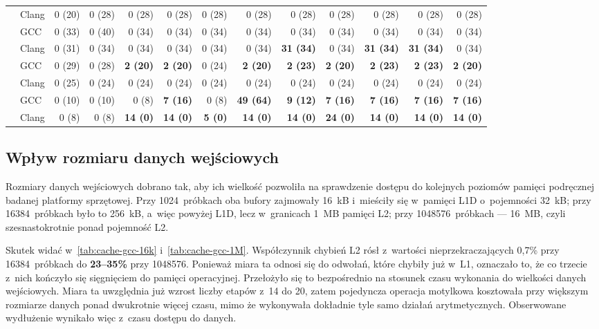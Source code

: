 \begin{table}[H]
\begin{tabular}{llrrrrrrrrrrr}
  & Clang & 0 (20) & 0 (28) & 0 (28) & 0 (28) & 0 (28) & 0 (28) & 0 (28) & 0 (28) & 0 (28) & 0 (28) & 0 (28) \\
\addlinespace
\multirow{2}{*}{radix4\_naive}
  & GCC   & 0 (33) & 0 (40) & 0 (34) & 0 (34) & 0 (34) & 0 (34) & 0 (34) & 0 (34) & 0 (34) & 0 (34) & 0 (34) \\
  & Clang & 0 (31) & 0 (34) & 0 (34) & 0 (34) & 0 (34) & 0 (34) & \textbf{31 (34)} & 0 (34) & \textbf{31 (34)} & \textbf{31 (34)} & 0 (34) \\
\addlinespace
\multirow{2}{*}{splitradix}
  & GCC   & 0 (29) & 0 (28) & \textbf{2 (20)} & \textbf{2 (20)} & 0 (24) & \textbf{2 (20)} & \textbf{2 (23)} & \textbf{2 (20)} & \textbf{2 (23)} & \textbf{2 (23)} & \textbf{2 (20)} \\
  & Clang & 0 (25) & 0 (24) & 0 (24) & 0 (24) & 0 (24) & 0 (24) & 0 (24) & 0 (24) & 0 (24) & 0 (24) & 0 (24) \\
\addlinespace
\multirow{2}{*}{stockham}
  & GCC   & 0 (10) & 0 (10) & 0 (8) & \textbf{7 (16)} & 0 (8) & \textbf{49 (64)} & \textbf{9 (12)} & \textbf{7 (16)} & \textbf{7 (16)} & \textbf{7 (16)} & \textbf{7 (16)} \\
  & Clang & 0 (8)  & 0 (8)  & \textbf{14 (0)} & \textbf{14 (0)} & \textbf{5 (0)} & \textbf{14 (0)} & \textbf{14 (0)} & \textbf{24 (0)} & \textbf{14 (0)} & \textbf{14 (0)} & \textbf{14 (0)} \\
\bottomrule
\end{tabular}
\end{table}

\subsection{Wpływ rozmiaru danych wejściowych}

Rozmiary danych wejściowych dobrano tak, aby ich wielkość pozwoliła na sprawdzenie dostępu do
kolejnych poziomów pamięci podręcznej badanej platformy sprzętowej. Przy 1024~próbkach oba
bufory zajmowały 16~kB i~mieściły się w~pamięci L1D o~pojemności 32~kB; przy
16384~próbkach było to 256~kB, a~więc powyżej L1D, lecz w~granicach 1~MB
pamięci L2; przy 1048576~próbkach --- 16~MB, czyli szesnastokrotnie ponad
pojemność L2.

Skutek widać w~\cref{tab:cache-gcc-16k} i~\cref{tab:cache-gcc-1M}. Współczynnik
chybień L2 rósł z~wartości nieprzekraczających 0,7\% przy 16384~próbkach do
\textbf{23--35\%} przy 1048576. Ponieważ miara ta odnosi się do odwołań, które chybiły już
w~L1, oznaczało to, że co trzecie z~nich kończyło się sięgnięciem do pamięci
operacyjnej. Przełożyło się to bezpośrednio na stosunek czasu wykonania do wielkości danych wejściowych.
Miara ta uwzględnia już wzrost liczby etapów z~14 do 20,
zatem pojedyncza operacja motylkowa kosztowała przy większym rozmiarze danych
ponad dwukrotnie więcej czasu, mimo że wykonywała dokładnie tyle samo działań
arytmetycznych. Obserwowane wydłużenie wynikało więc z~czasu dostępu do
danych.

